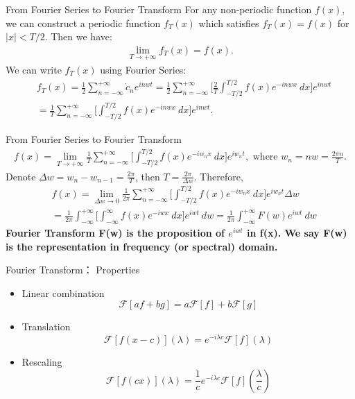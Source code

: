 \documentclass{beamer}
\begin{document}
	\begin{frame}{From Fourier Series to Fourier Transform}
		For any non-periodic function $f(x)$, we can construct a periodic function $f_T(x)$ which satisfies $f_T(x) = f(x)$ for $|x| < T/2$. Then we have:
		\begin{align*}
			\lim_{T \rightarrow +\infty} f_T(x) = f(x).
		\end{align*}
		We can write $f_T(x)$ using Fourier Series:
		\begin{align*}
			& f_T(x) = \frac{1}{2}\sum_{n=-\infty}^{+\infty}\dot{c}_ne^{inwt} = \frac{1}{2}\sum_{n=-\infty}^{+\infty}\big[\frac{2}{T}\int_{-T/2}^{T/2}f(x)e^{-inwx}\ dx\big]e^{inwt} \\
			& = \frac{1}{T}\sum_{n=-\infty}^{+\infty}\big[\int_{-T/2}^{T/2}f(x)e^{-inwx}\ dx\big]e^{inwt}.
		\end{align*}
	\end{frame}
	\begin{frame}{From Fourier Series to Fourier Transform}
		\begin{align*}
			f(x) = \lim_{T \rightarrow +\infty} \frac{1}{T}\sum_{n=-\infty}^{+\infty}\big[\int_{-T/2}^{T/2}f(x)e^{-iw_nx}\ dx\big]e^{iw_nt}, \text{ where } w_n = nw = \frac{2\pi n}{T}.
		\end{align*}
		Denote $\Delta w = w_n - w_{n-1} = \frac{2\pi}{T}$, then $T = \frac{2\pi}{\Delta w}$. Therefore,
		\begin{align*}
			& f(x) = \lim_{\Delta w \rightarrow 0} \frac{1}{2\pi}\sum_{n=-\infty}^{+\infty}\big[\int_{-T/2}^{T/2}f(x)e^{-iw_nx}\ dx\big]e^{iw_nt} \Delta w \\
			& = \frac{1}{2\pi}\int_{-\infty}^{+\infty}\big[\int_{-\infty}^{\infty}f(x)e^{-iwx}\ dx\big]e^{iwt} \ dw = \frac{1}{2\pi}\int_{-\infty}^{+\infty}F(w)e^{iwt} \ dw
		\end{align*}
		\textbf{Fourier Transform F(w) is the proposition of $e^{iwt}$ in f(x). We say F(w) is the representation in frequency (or spectral) domain.}
	\end{frame}

	\begin{frame}{Fourier Transform： Properties}
		\begin{itemize}
			\item Linear combination
			\[
			\mathcal{F}[af+bg] = a\mathcal{F}[f] + b\mathcal{F}[g]
			\]
			\item Translation
			\[
			\mathcal{F}[f(x-c)](\lambda) = e^{-i\lambda c}\mathcal{F}[f](\lambda)
			\]
			\item Rescaling
			\[
			\mathcal{F}[f(cx)](\lambda) = \frac{1}{c}e^{-i\lambda c}\mathcal{F}[f](\frac{\lambda}{c})
			\]
		\end{itemize}
	\end{frame}
	
\end{document}
